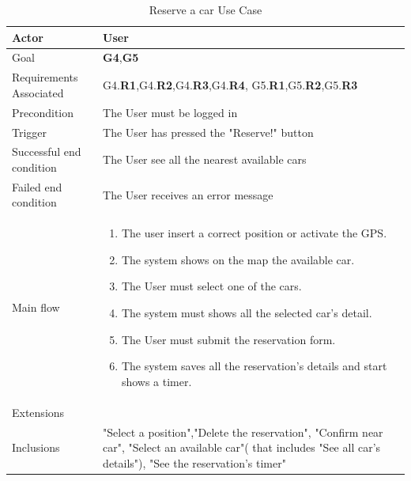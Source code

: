 \newline
\begin{table}[htb]
\begin{center}
\renewcommand{\arraystretch}{1.5}
\begin{tabular}{|l|p{}|}
\hline
Actor & User \\ \hline
Goal & \textbf{G4},\textbf{G5} \\ \hline
Requirements Associated & G4.\textbf{R1},G4.\textbf{R2},G4.\textbf{R3},G4.\textbf{R4}, G5.\textbf{R1},G5.\textbf{R2},G5.\textbf{R3} \\ \hline
Precondition & The User must be logged in \\ \hline
Trigger & The User has pressed the "Reserve!" button \\ \hline
Successful end condition & The User see all the nearest available cars \\ \hline
Failed end condition & The User receives an error message \\ \hline
Main flow & \begin{minipage}[t]{0.6\textwidth}
\begin{enumerate}
\addtolength{\itemindent}{0.5cm}
\item The user insert a correct position or activate the GPS.
\item The system shows on the map the available car.
\item The User must select one of the cars.
\item The system must shows all the selected car's detail.
\item The User must submit the reservation form.
\item The system saves all the reservation's details and start shows a timer. 
\end{enumerate}
\end{minipage} \\ \hline
Extensions & \\ \hline
Inclusions & "Select a position","Delete the reservation", "Confirm near car", "Select an available car"( that includes "See all car's details"), "See the reservation's timer" \\ \hline
\end{tabular}
\caption{Reserve a car Use Case}
\end{center}
\end{table}
\clearpage

